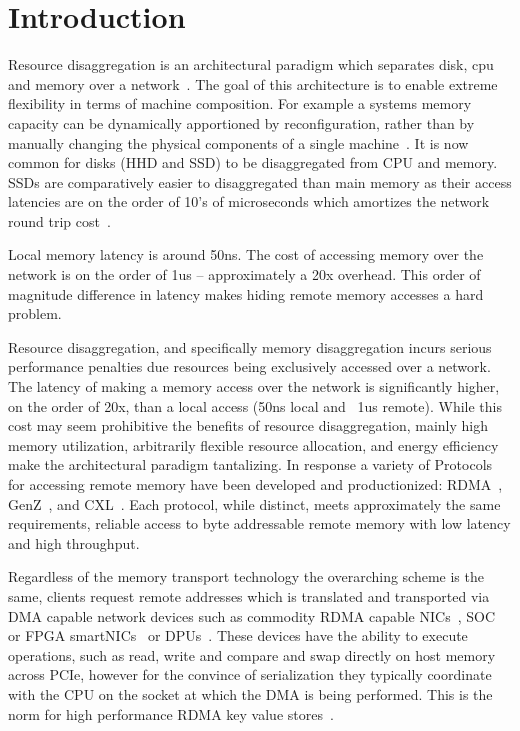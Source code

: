 \section{Introduction}

Resource disaggregation is an architectural paradigm which separates disk, cpu
and memory over a network~\cite{requirements,legoos}. The goal of this
architecture is to enable extreme flexibility in terms of machine composition.
For example a systems memory capacity can be dynamically apportioned by
reconfiguration, rather than by manually changing the physical components of a
single machine~\cite{fastswap}. It is now common for disks (HHD and SSD) to be
disaggregated from CPU and memory. SSDs are comparatively easier to
disaggregated than main memory as their access latencies are on the order of
10's of microseconds which amortizes the network round trip cost~\cite{decible}.

Local memory latency is around 50ns. The cost of accessing memory over the
network is on the order of 1us -- approximately a 20x overhead. This order of
magnitude difference in latency makes hiding remote memory accesses a hard
problem.  

Resource disaggregation, and specifically memory disaggregation incurs serious
performance penalties due resources being exclusively accessed over a network.
The latency of making a memory access over the network is significantly higher,
on the order of 20x, than a local access (50ns local and ~1us remote).  While
this cost may seem prohibitive the benefits of resource disaggregation, mainly
high memory utilization, arbitrarily flexible resource allocation, and energy
efficiency~\cite{zombieland} make the architectural paradigm tantalizing. In
response a variety of Protocols for accessing remote memory have been developed
and productionized: RDMA~\cite{infiniband-spec}, GenZ~\cite{genz}, and
CXL~\cite{cxl}.
Each protocol, while distinct, meets approximately the same requirements,
reliable access to byte addressable remote memory with low latency and high
throughput.

Regardless of the memory transport technology the overarching scheme is the
same, clients request remote addresses which is translated and transported via  
DMA capable network devices such as commodity RDMA capable NICs~\cite{connectx},
SOC~\cite{cavium} or FPGA smartNICs~\cite{corundum,kv-direct} or
DPUs~\cite{fungible}.  These devices have the ability to execute operations,
such as read, write and compare and swap directly on host memory across PCIe,
however for the convince of serialization they typically coordinate with the CPU
on the socket at which the DMA is being performed. This is the norm for high
performance RDMA key value stores~\cite{cliquemap,erpc,herd,sonuma,storm}. 

